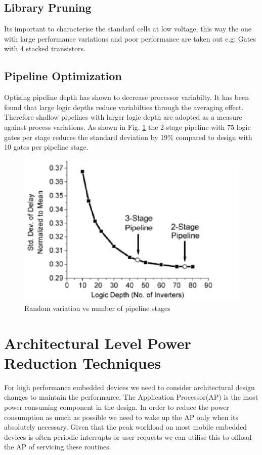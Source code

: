 \documentclass[conference]{IEEEtran}
\begin{document}
\subsection{Library Pruning}
Its important to characterise the standard cells at low voltage, this way the one with large performance variations and poor performance are taken out e.g: Gates with 4 stacked transistors.
\subsection{Pipeline Optimization}
Optising pipeline depth has shown to decrease processor variabilty. It has been found that large logic depths reduce variabilties through the averaging effect. Therefore shallow pipelines with larger logic depth are adopted as a measure against process variations. As shown in Fig. \ref{fig:PplstageVSlogicdepth} the 2-stage pipeline with 75 logic gates per stage reduces the standard deviation by 19\% compared to design with 10 gates per pipeline stage.

\begin{figure}[htbp]
	\includegraphics[width=\linewidth]{img/Pictures/PplstageVSlogicdepth.png}
	\centering
	\caption{Random variation vs number of pipeline stages \cite{b1}}
	\label{fig:PplstageVSlogicdepth}
\end{figure}

\section{Architectural Level Power Reduction Techniques} \label{sec:Case_Study}
For high performance embedded devices we need to consider architectural design
changes to maintain the performance. The Application Processor(AP) is the most
power consuming component in the design. In order to reduce the power consumption as
much as possible we need to wake up the AP only when its absolutely necessary.
Given that the peak workload on most mobile embedded devices is often
periodic interrupts or user requests we can utilise this to offload the
AP of servicing these routines.
\end{document}
